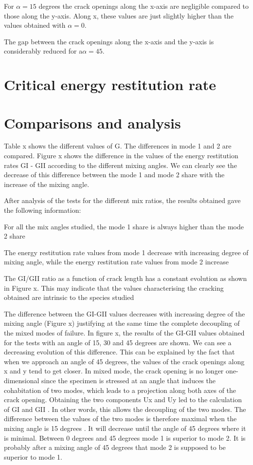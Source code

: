 For $\alpha=15$ degrees the crack openings along the x-axis are negligible compared to those along the y-axis. Along x, these values are just slightly higher than the values obtained with $\alpha=0$.

The gap between the crack openings along the x-axis and the y-axis is considerably reduced for a$\alpha=45$.

\section{Critical energy restitution rate}

\section{Comparisons and analysis}

Table x shows the different values of G. The differences in mode 1 and 2 are compared.
Figure x shows the difference in the values of the energy restitution rates GI - GII according to the different mixing angles. We can clearly see the decrease of this difference between the mode 1 and mode 2 share with the increase of the mixing angle.

After analysis of the tests for the different mix ratios, the results obtained gave the following information:

For all the mix angles studied, the mode 1 share is always higher than the mode 2 share

The energy restitution rate values from mode 1 decrease with increasing degree of mixing angle, while the energy restitution rate values from mode 2 increase

The GI/GII ratio as a function of crack length has a constant evolution as shown in Figure x. This may indicate that the values characterising the cracking obtained are intrinsic to the species studied

The difference between the GI-GII values decreases with increasing degree of the mixing angle (Figure x) justifying at the same time the complete decoupling of the mixed modes of failure. In figure x, the results of the GI-GII values obtained for the tests with an angle of 15, 30 and 45 degrees are shown. We can see a decreasing evolution of this difference. This can be explained by the fact that when we approach an angle of 45 degrees, the values of the crack openings along x and y tend to get closer. In mixed mode, the crack opening is no longer one-dimensional since the specimen is stressed at an angle that induces the cohabitation of two modes, which leads to a projection along both axes of the crack opening. Obtaining the two components Ux and Uy led to the calculation of GI and GII . In other words, this allows the decoupling of the two modes. The difference between the values of the two modes is therefore maximal when the mixing angle is 15 degrees . It will decrease until the angle of 45 degrees where it is minimal. Between 0 degrees and 45 degrees mode 1 is superior to mode 2. It is probably after a mixing angle of 45 degrees that mode 2 is supposed to be superior to mode 1.

